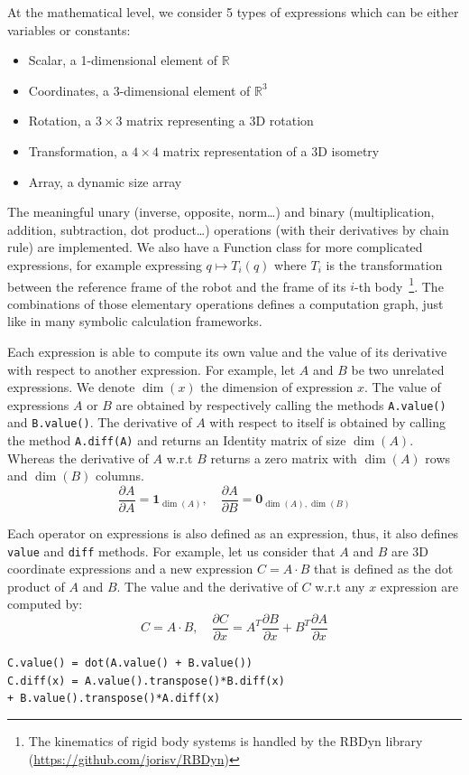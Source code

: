 At the mathematical level, we consider 5 types of expressions which can be either variables or constants:
\begin{itemize}
  \item Scalar, a 1-dimensional element of $\mathbb{R}$
  \item Coordinates, a 3-dimensional element of $\mathbb{R}^3$
  \item Rotation, a $3\times3$ matrix representing a 3D rotation
  \item Transformation, a $4\times4$ matrix representation of a 3D isometry
  \item Array, a dynamic size array
\end{itemize}
The meaningful unary (inverse, opposite, norm\ldots) and binary (multiplication, addition, subtraction, dot product\ldots) operations (with their derivatives by chain rule) are implemented.
We also have a Function class for more complicated expressions, for example expressing $q \mapsto T_i(q)$ where $T_i$ is the transformation between the reference frame of the robot and the frame of its $i$-th body~\footnote{The kinematics of rigid body systems is handled by the RBDyn library (\url{https://github.com/jorisv/RBDyn})}.
The combinations of those elementary operations defines a computation graph, just like in many symbolic calculation frameworks.

Each expression is able to compute its own value and the value of its derivative with respect to another expression.
For example, let $A$ and $B$ be two unrelated expressions.
We denote $\dim(x)$ the dimension of expression $x$.
The value of expressions $A$ or $B$ are obtained by respectively calling the methods {\tt A.value()} and {\tt B.value()}.
The derivative of $A$ with respect to itself is obtained by calling the method {\tt A.diff(A)} and returns an Identity matrix of size $\dim(A)$.
Whereas the derivative of $A$ w.r.t $B$ returns a zero matrix with $\dim(A)$ rows and $\dim(B)$ columns.
\begin{equation}
  \frac{\partial A}{\partial A} = \mathbf{1}_{\dim(A)}, \quad \frac{\partial A}{\partial B} = \mathbf{0}_{\dim(A),\dim(B)}
\end{equation}

Each operator on expressions is also defined as an expression, thus, it also defines {\tt value} and {\tt diff} methods.
For example, let us consider that $A$ and $B$ are 3D coordinate expressions and a new expression $C = A\cdot B$ that is defined as the dot product of $A$ and $B$.
The value and the derivative of $C$ w.r.t any $x$ expression are computed by:
\begin{equation}
  C = A\cdot B,\quad \frac{\partial C}{\partial x} = A^T\frac{\partial B}{\partial x} + B^T\frac{\partial A}{\partial x}
\end{equation}
\begin{center}
{\tt C.value() = dot(A.value() + B.value())\\
C.diff(x) = A.value().transpose()*B.diff(x) \\ + B.value().transpose()*A.diff(x)}
\end{center}

